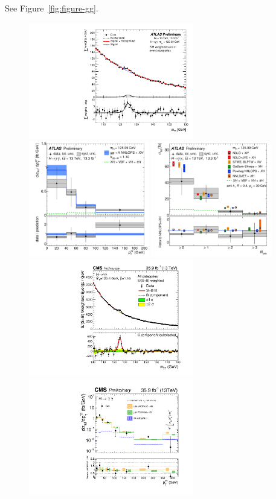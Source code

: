 \documentclass[10pt]{article}
\begin{document}
See Figure~\ref{fig:figure-gg}.

\begin{figure}[htb]
\centering
\includegraphics[height=2in]{figures/ATLAS-CONF-2016-067__fig_07__mgg.pdf}
\includegraphics[height=2in]{figures/ATLAS-CONF-2016-067__fig_10a__pTgg.pdf}
\includegraphics[height=2in]{figures/ATLAS-CONF-2016-067__fig_11b__njets.pdf}\\
\includegraphics[height=2in]{figures/CMS-HIG-16-040__Figure_013-b__mgg.pdf}
\includegraphics[height=2in]{figures/CMS-HIG-17-015__Figure_004-a__pTgg.pdf}

\end{figure}
\end{document}
